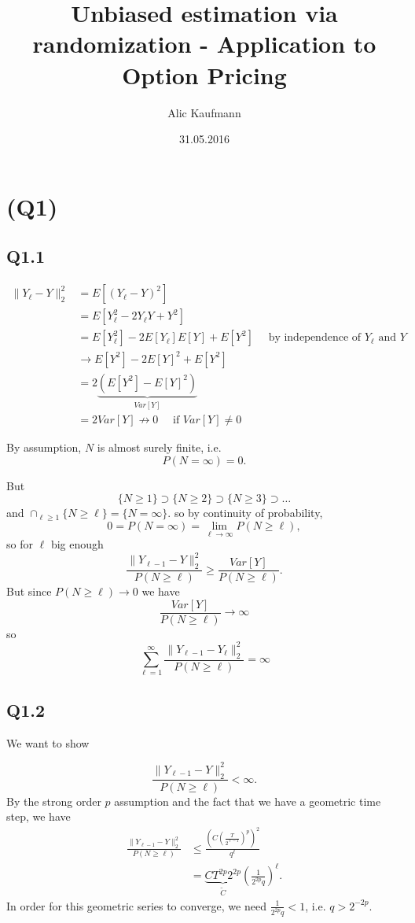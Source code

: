 \documentclass[11pt, a4paper]{article}
\title{Unbiased estimation via randomization - Application to
Option Pricing}
\author{Alic Kaufmann}
\date{31.05.2016}
\begin{document}
\maketitle

\section*{(Q1)}

\subsection*{Q1.1}
\begin{align*}
    \|Y_\ell -Y\|_2^2
    &= E[(Y_\ell-Y)^2]\\
    &= E[Y_\ell^2 - 2Y_\ell Y + Y^2]\\
    &= E[Y_\ell^2]-2E[Y_\ell]E[Y]+E[Y^2]\quad\text{ by independence of }Y_\ell\text{ and }Y\\
    &\to E[Y^2]-2 E[Y]^2 + E[Y^2]\\
    &= 2\underbrace{(E[Y^2]-E[Y]^2)}_{Var[Y]}\\
    &=2 Var[Y] \not\to 0\quad\text{ if }Var[Y]\neq0
\end{align*}

By assumption, $N$ is almost surely finite, i.e. $$P(N=\infty)=0.$$

But $$\{N\ge 1\}\supset \{N\ge 2\}\supset\{N\ge3\}\supset\ldots$$
and  $\cap_{\ell\ge 1}\{N\ge \ell\}=\{N=\infty\}.$ so by continuity of probability,
$$0=P(N=\infty)=\lim_{\ell\to\infty}P(N\ge \ell), $$ so for $\ell$ big enough
$$\frac{\|Y_{\ell-1}-Y\|_2^2}{P(N\ge \ell)}\ge \frac{Var[Y]}{P(N\ge \ell)}.$$
But since $P(N\ge \ell)\to0$ we have $$\frac{Var[Y]}{P(N\ge \ell)}\to\infty$$ so
$$\sum_{\ell=1}^{\infty} \frac{\|Y_{\ell-1}-Y_\ell\|_2^2}{P(N\ge \ell)}=\infty$$
\subsection*{Q1.2} We want to show

\begin{equation}\label{dummy}
\frac{\|Y_{\ell-1}-Y\|_2^2}{P(N\ge \ell)}<\infty.
\end{equation}
By the strong order $p$ assumption and the fact that we have a geometric time step, we have
\begin{align*}
\frac{\|Y_{\ell-1}-Y\|_2^2}{P(N\ge \ell)}&\le \frac{\left(C\left(\frac{T}{2^{\ell-1}}\right)^p\right)^2}{q^\ell} \\
&= \underbrace{CT^{2p}2^{2p}}_{\tilde{C}}\left(\frac{1}{2^{2p}q}\right)^\ell.
\end{align*}
In order for this geometric series to converge, we need $\frac{1}{2^{2p}q}<1$, i.e. $q>2^{-2p}.$
\end{document}
